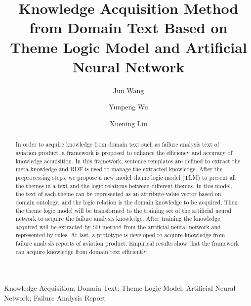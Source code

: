 \documentclass{elsarticle}
\begin{document}
\begin{frontmatter}


\title{Knowledge Acquisition Method from Domain Text Based on Theme Logic Model and Artificial Neural Network }


\author[buaa]{Jun Wang}
\author[buaa]{Yunpeng Wu}
\author[buaa]{Xuening Liu}





\address[buaa]{School of Economics \& Management, Beihang University, Beijing 100083,
P.R. China }


\begin{abstract}
In order to acquire knowledge from domain text such as failure analysis text of aviation product, a framework is proposed to enhance the efficiency and accuracy of knowledge acquisition. In this framework, sentence templates are defined to extract the meta-knowledge and RDF is used to manage the extracted knowledge.  After the preprocessing steps, we propose a new model theme logic model (TLM) to present all the themes in a text and the logic relations between different themes. In this model, the text of each theme can be represented as an attribute-value vector based on domain ontology, and the logic relation is the domain knowledge to be acquired. Then the theme logic model will be transformed to the training set of the artificial neural network to acquire the failure analysis knowledge. After training the knowledge acquired will be extracted by SD method from the artificial neural network and represented by rules. At last, a prototype is developed to acquire knowledge from failure analysis reports of aviation product. Empirical results show that the framework can acquire knowledge from domain text efficiently.
\end{abstract}

\begin{keyword}


Knowledge Acquisition; Domain Text; Theme Logic Model; Artificial Neural Network; Failure Analysis Report


\end{keyword}

\end{frontmatter}
\end{document}
